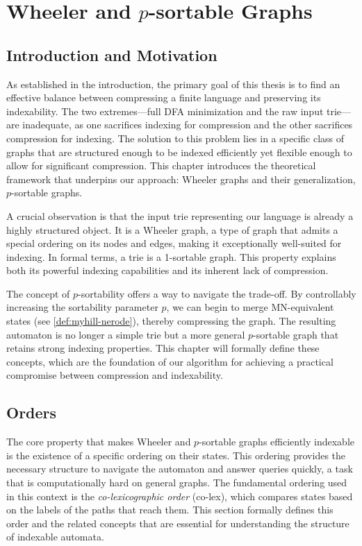 \section{Wheeler and $p$-sortable Graphs}
\label{sec:wheeler_and_psortable_graphs}

\subsection{Introduction and Motivation}
As established in the introduction, the primary goal of this thesis is to find an effective balance between compressing a finite language and preserving its indexability. The two extremes—full DFA minimization and the raw input trie—are inadequate, as one sacrifices indexing for compression and the other sacrifices compression for indexing. The solution to this problem lies in a specific class of graphs that are structured enough to be indexed efficiently yet flexible enough to allow for significant compression. This chapter introduces the theoretical framework that underpins our approach: Wheeler graphs and their generalization, $p$-sortable graphs.

A crucial observation is that the input trie representing our language is already a highly structured object. It is a Wheeler graph, a type of graph that admits a special ordering on its nodes and edges, making it exceptionally well-suited for indexing. In formal terms, a trie is a 1-sortable graph. This property explains both its powerful indexing capabilities and its inherent lack of compression.

The concept of $p$-sortability offers a way to navigate the trade-off. By controllably increasing the sortability parameter $p$, we can begin to merge MN-equivalent states (see \cref{def:myhill-nerode}), thereby compressing the graph. The resulting automaton is no longer a simple trie but a more general $p$-sortable graph that retains strong indexing properties. This chapter will formally define these concepts, which are the foundation of our algorithm for achieving a practical compromise between compression and indexability.

\subsection{Orders}
The core property that makes Wheeler and $p$-sortable graphs efficiently indexable is the existence of a specific ordering on their states. This ordering provides the necessary structure to navigate the automaton and answer queries quickly, a task that is computationally hard on general graphs. The fundamental ordering used in this context is the \textit{co-lexicographic order} (co-lex), which compares states based on the labels of the paths that reach them. This section formally defines this order and the related concepts that are essential for understanding the structure of indexable automata.

